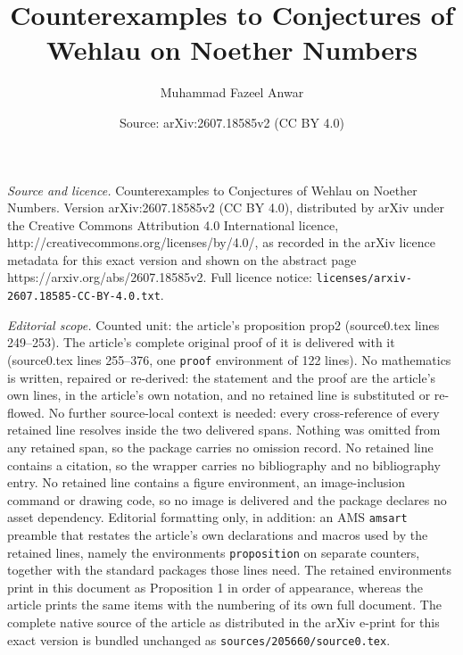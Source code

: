 \documentclass[10pt,a4paper]{amsart}
\title{Counterexamples to Conjectures of Wehlau on Noether Numbers}
\author{Muhammad Fazeel Anwar}
\date{Source: arXiv:2607.18585v2 (CC BY 4.0)}
\begin{document}
\maketitle

\noindent\emph{Source and licence.} Counterexamples to Conjectures of Wehlau on Noether Numbers. Version arXiv:2607.18585v2 (CC BY 4.0), distributed by arXiv under the Creative Commons Attribution 4.0 International licence, http://creativecommons.org/licenses/by/4.0/, as recorded in the arXiv licence metadata for this exact version and shown on the abstract page https://arxiv.org/abs/2607.18585v2. Full licence notice: \texttt{licenses/arxiv-2607.18585-CC-BY-4.0.txt}.\par\smallskip

\noindent\textit{Editorial scope.} Counted unit: the article's proposition prop2 (source0.tex lines 249--253). The article's complete original proof of it is delivered with it (source0.tex lines 255--376, one \texttt{proof} environment of 122 lines). No mathematics is written, repaired or re-derived: the statement and the proof are the article's own lines, in the article's own notation, and no retained line is substituted or re-flowed.  No further source-local context is needed: every cross-reference of every retained line resolves inside the two delivered spans.  Nothing was omitted from any retained span, so the package carries no omission record.  No retained line contains a citation, so the wrapper carries no bibliography and no bibliography entry.  No retained line contains a figure environment, an image-inclusion command or drawing code, so no image is delivered and the package declares no asset dependency.  Editorial formatting only, in addition: an AMS \texttt{amsart} preamble that restates the article's own declarations and macros used by the retained lines, namely the environments \texttt{proposition} on separate counters, together with the standard packages those lines need.  The retained environments print in this document as Proposition 1 in order of appearance, whereas the article prints the same items with the numbering of its own full document.  The complete native source of the article as distributed in the arXiv e-print for this exact version is bundled unchanged as \texttt{sources/205660/source0.tex}.
\end{document}
